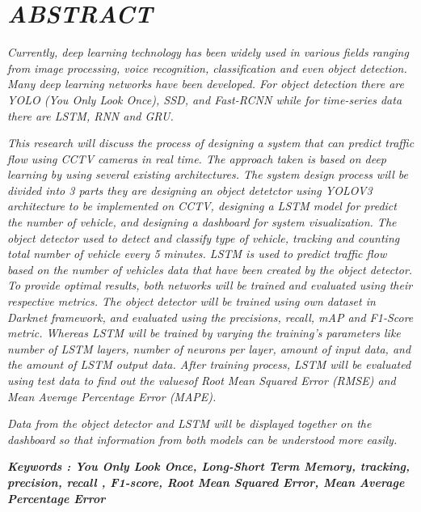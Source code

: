 \documentclass[../thesis.tex]{subfiles}
\begin{document}
\chapter*{\emph{ABSTRACT}}%
\normalfont
\vspace{1.0cm}
\begin{singlespacing}%
{}

\emph{Currently, deep learning technology has been widely used in various fields ranging from image processing, voice recognition, classification and even object detection. Many deep learning networks have been developed. For object detection there are
YOLO (You Only Look Once), SSD, and Fast-RCNN while for time-series data there are LSTM, RNN and GRU.
}

\emph{This research will discuss the process of designing a system that can predict traffic flow using CCTV cameras in real time. The approach taken is based on deep learning by using several existing architectures.
The system design process will be divided into 3 parts they are designing an object detetctor using YOLOV3 architecture to be implemented on CCTV, designing a LSTM model for predict the number of vehicle, and designing a dashboard for system visualization.
The object detector used to detect and classify type of vehicle, tracking and counting total number of vehicle every 5 minutes. 
LSTM is used to predict traffic flow based on the number of vehicles data that have been created by the object detector. 
To provide optimal results, both networks will be trained and evaluated using their respective metrics. 
The object detector will be trained using own dataset in Darknet framework, and evaluated using the precisions, recall, mAP and F1-Score metric.
Whereas LSTM will be trained by varying the training's parameters like number of LSTM layers, number of neurons per layer, amount of input data, and the amount of LSTM output data. After training process, LSTM will be evaluated using test data to find out the values ​​of Root Mean Squared Error (RMSE) and Mean Average Percentage Error (MAPE).
}

\emph{Data from the object detector and LSTM will be displayed together on the dashboard so that information from both models can be understood more easily.
}

\bigskip
\noindent

\textbf{\emph{Keywords : You Only Look Once, Long-Short Term Memory, tracking, precision, recall , F1-score, Root Mean Squared Error, Mean Average Percentage Error }}
\end{singlespacing}
\end{document}
